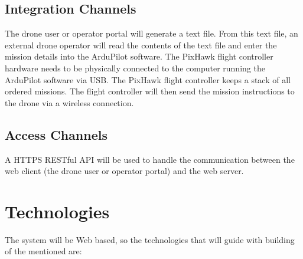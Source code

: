 \documentclass{article}
\begin{document}
	\subsection{Integration Channels}
	The drone user or operator portal will generate a text file. From this text file, an external drone operator will read the contents of the text file and enter the mission details into the ArduPilot software. The PixHawk flight controller hardware needs to be physically connected to the computer running the ArduPilot software via USB. The PixHawk flight controller keeps a stack of all ordered missions. The flight controller will then send the mission instructions to the drone via a wireless connection.
	\subsection{Access Channels}
	A HTTPS RESTful API will be used to handle the communication between the web client (the drone user or operator portal) and the web server. 
	\section{Technologies}%
	
	 
	 
	 The system will be Web based, so the technologies that will guide with building of the mentioned are:
	 
\end{document}
